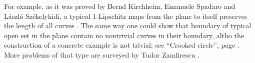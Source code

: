 For example, as it was proved by
Bernd Kirchheim, 
Emanuele Spadaro  
and 
L{\'a}szl{\'o} Sz{\'e}kelyhidi,
a typical 1-Lipschitz maps from the plane to itself preserves the length of all curves \cite[see][]{KSS}.
The same way one could show that boundary of typical open set in the plane contain no nontrivial curves in their boundary, 
altho the construction of a concrete example is not trivial;
see ``Crooked circle'', page \pageref{Crooked circle}.
More problems of that type are surveyed by Tudor Zamfirescu \cite[see][]{zamfirescu}.







